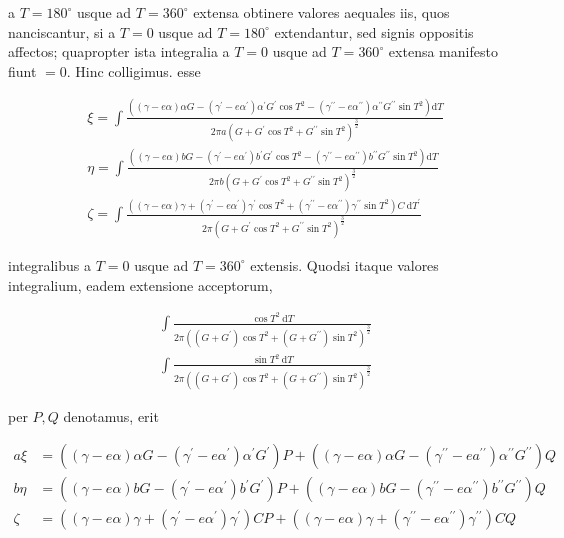 \documentclass[10pt]{article}
\begin{document}
a \(T=180^{\circ}\) usque ad \(T=360^{\circ}\) extensa obtinere valores aequales iis, quos nanciscantur, si a \(T=0\) usque ad \(T=180^{\circ}\) extendantur, sed signis oppositis affectos; quapropter ista integralia a \(T=0\) usque ad \(T=360^{\circ}\) extensa manifesto fiunt \(=0\). Hinc colligimus. esse

\[
\begin{aligned}
& \xi=\int \frac{\left((\gamma-e \alpha) \alpha G-\left(\gamma^{\prime}-e \alpha^{\prime}\right) \alpha^{\prime} G^{\prime} \cos T^{2}-\left(\gamma^{\prime \prime}-e \alpha^{\prime \prime}\right) \alpha^{\prime \prime} G^{\prime \prime} \sin T^{2}\right) \mathrm{d} T}{2 \pi a\left(G+G^{\prime} \cos T^{2}+G^{\prime \prime} \sin T^{2}\right)^{\frac{3}{2}}} \\
& \eta=\int \frac{\left((\gamma-e \alpha) b G-\left(\gamma^{\prime}-e \alpha^{\prime}\right) b^{\prime} G^{\prime} \cos T^{2}-\left(\gamma^{\prime \prime}-e \alpha^{\prime \prime}\right) b^{\prime \prime} G^{\prime \prime} \sin T^{2}\right) \mathrm{d} T}{2 \pi b\left(G+G^{\prime} \cos T^{2}+G^{\prime \prime} \sin T^{2}\right)^{\frac{3}{2}}} \\
& \zeta=\int \frac{\left((\gamma-e \alpha) \gamma+\left(\gamma^{\prime}-e \alpha^{\prime}\right) \gamma^{\prime} \cos T^{2}+\left(\gamma^{\prime \prime}-e \alpha^{\prime \prime}\right) \gamma^{\prime \prime} \sin T^{2}\right) C \mathrm{~d} T^{\prime}}{2 \pi\left(G+G^{\prime} \cos T^{2}+G^{\prime \prime} \sin T^{2}\right)^{\frac{3}{2}}}
\end{aligned}
\]

integralibus a \(T=0\) usque ad \(T=360^{\circ}\) extensis. Quodsi itaque valores integralium, eadem extensione acceptorum,

\[
\begin{aligned}
& \int \frac{\cos T^{2} \mathrm{~d} T}{2 \pi\left(\left(G+G^{\prime}\right) \cos T^{2}+\left(G+G^{\prime \prime}\right) \sin T^{2}\right)^{\frac{3}{2}}} \\
& \int \frac{\sin T^{2} \mathrm{~d} T}{2 \pi\left(\left(G+G^{\prime}\right) \cos T^{2}+\left(G+G^{\prime \prime}\right) \sin T^{2}\right)^{\frac{3}{2}}}
\end{aligned}
\]

per \(P, Q\) denotamus, erit

\[
\begin{aligned}
a \xi & =\left((\gamma-e \alpha) \alpha G-\left(\gamma^{\prime}-e \alpha^{\prime}\right) \alpha^{\prime} G^{\prime}\right) P+\left((\gamma-e \alpha) \alpha G-\left(\gamma^{\prime \prime}-e a^{\prime \prime}\right) \alpha^{\prime \prime} G^{\prime \prime}\right) Q \\
b \eta & =\left((\gamma-e \alpha) b G-\left(\gamma^{\prime}-e \alpha^{\prime}\right) b^{\prime} G^{\prime}\right) P+\left((\gamma-e \alpha) b G-\left(\gamma^{\prime \prime}-e \alpha^{\prime \prime}\right) b^{\prime \prime} G^{\prime \prime}\right) Q \\
\zeta & =\left((\gamma-e \alpha) \gamma+\left(\gamma^{\prime}-e \alpha^{\prime}\right) \gamma^{\prime}\right) C P+\left((\gamma-e \alpha) \gamma+\left(\gamma^{\prime \prime}-e \alpha^{\prime \prime}\right) \gamma^{\prime \prime}\right) C Q
\end{aligned}
\]
\end{document}
